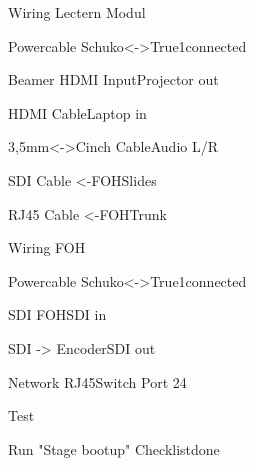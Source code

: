 \begin{checklist}{Wiring Lectern Modul}
  \item{Powercable Schuko<->True1}{connected}
  \item{Beamer HDMI Input}{Projector out}
  \item{HDMI Cable}{Laptop in}
  \item{3,5mm<->Cinch Cable}{Audio L/R}
  \item{SDI Cable <-FOH}{Slides}
  \item{RJ45 Cable <-FOH}{Trunk}
\end{checklist}

\begin{checklist}{Wiring FOH}
  \item{Powercable Schuko<->True1}{connected}
  \item{SDI FOH}{SDI in}
  \item{SDI -> Encoder}{SDI out}
  \item{Network RJ45}{Switch Port 24}
\end{checklist}

\begin{checklist}{Test}
  \item{Run "Stage bootup" Checklist}{done}
\end{checklist}


